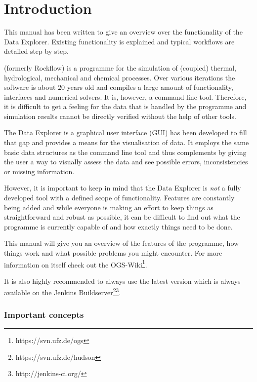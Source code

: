 \chapter{Introduction}

This manual has been written to give an overview over the functionality of the \ogs Data Explorer. Existing functionality is explained and typical workflows are detailed step by step.

\bigskip

\ogs (formerly Rockflow) is a programme for the simulation of (coupled) thermal, hydrological, mechanical and chemical processes. Over various iterations the software is about $20$ years old and compiles a large amount of functionality, interfaces and numerical solvers. It is, however, a command line tool. Therefore, it is difficult to get a feeling for the data that is handled by the programme and simulation results cannot be directly verified without the help of other tools.

The \ogs Data Explorer is a graphical user interface (GUI) has been developed to fill that gap and provides a means for the visualisation of data. It employs the same basic data structures as the command line tool and thus complements \ogs by giving the user a way to visually assess the data and see possible errors, inconsistencies or missing information.

However, it is important to keep in mind that the \ogs Data Explorer is \emph{not} a fully developed tool with a defined scope of functionality. Features are constantly being added and while everyone is making an effort to keep things as straightforward and robust as possible, it can be difficult to find out what the programme is currently capable of and how exactly things need to be done.

This manual will give you an overview of the features of the programme, how things work and what possible problems you might encounter. For more information on \ogs itself check out the OGS-Wiki\footnote{https://svn.ufz.de/ogs}.

It is also highly recommended to always use the latest version which is always available on the Jenkins  Buildserver\footnote{https://svn.ufz.de/hudson}\footnote{http://jenkins-ci.org/}.

\subsection*{Important concepts}

